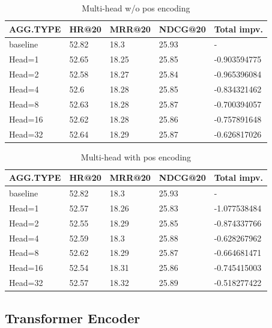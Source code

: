 \documentclass{article}
\begin{document}
\begin{table}
    \caption{Multi-head w/o pos encoding}
    \label{Multi-head w/o pos encoding}
    \centering
    \begin{tabular}{lllll}
        \toprule
        AGG.TYPE & HR@20 & MRR@20 & NDCG@20 & Total impv.  \\
        \midrule
        baseline & 52.82 & 18.3   & 25.93   & -            \\
        Head=1   & 52.65 & 18.25  & 25.85   & -0.903594775 \\
        Head=2   & 52.58 & 18.27  & 25.84   & -0.965396084 \\
        Head=4   & 52.6  & 18.28  & 25.85   & -0.834321462 \\
        Head=8   & 52.63 & 18.28  & 25.87   & -0.700394057 \\
        Head=16  & 52.62 & 18.28  & 25.86   & -0.757891648 \\
        Head=32  & 52.64 & 18.29  & 25.87   & -0.626817026 \\
        \bottomrule
    \end{tabular}
\end{table}

\begin{table}
    \caption{Multi-head with pos encoding}
    \label{Multi-head with pos encoding}
    \centering
    \begin{tabular}{lllll}
        \toprule
        AGG.TYPE & HR@20 & MRR@20 & NDCG@20 & Total impv.  \\
        \midrule
        baseline & 52.82 & 18.3   & 25.93   & -            \\
        Head=1   & 52.57 & 18.26  & 25.83   & -1.077538484 \\
        Head=2   & 52.55 & 18.29  & 25.85   & -0.874337766 \\
        Head=4   & 52.59 & 18.3   & 25.88   & -0.628267962 \\
        Head=8   & 52.62 & 18.29  & 25.87   & -0.664681471 \\
        Head=16  & 52.54 & 18.31  & 25.86   & -0.745415003 \\
        Head=32  & 52.57 & 18.32  & 25.89   & -0.518277422 \\
        \bottomrule
    \end{tabular}
\end{table}

\subsection{Transformer Encoder}
\end{document}
